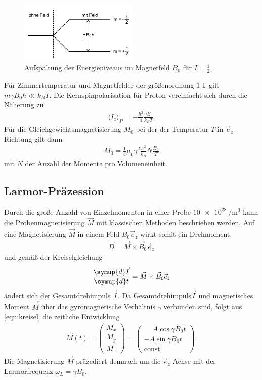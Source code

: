\begin{figure}
 \centering
 \includegraphics[width=0.5\textwidth]{Zeeman.PNG}
 \caption{Aufspaltung der Energieniveaus im Magnetfeld $B_0$ für $I=\tfrac{1}{2}$.\cite{sample}}
 \label{fig:Proton}
\end{figure}
Für Zimmertemperatur und Magnetfelder
der größenordnung $\SI{1}{\tesla}$
gilt $m\gamma B_0 \hbar \ll k_BT$.
Die Kernspinpolarisation für Proton
vereinfacht sich
durch die Näherung zu
\begin{align}
\langle I_z\rangle_P= -\frac{\hbar^2}{4}\frac{\gamma B_0}{k_B T}.
\end{align}
Für die Gleichgewichtsmagnetisierung $M_0$ bei der
der Temperatur $T$ in $\vec{e}_z$-Richtung gilt dann
\begin{align}
M_0=\frac{1}{4}\mu_0 \gamma^2 \frac{\hbar^2}{k_B} N \frac{B_0}{T}
\end{align}
mit $N$ der Anzahl der Momente pro Volumeneinheit.

\subsection{Larmor-Präzession}
\label{subsec:Larmor}
Durch die große Anzahl von Einzelmomenten in einer Probe \approx $\SI{10e28}{\per\cubic\meter}$
kann die Probenmagnetisierung $\vec{M}$ mit klassischen Methoden
beschrieben werden.
Auf eine Magnetisierung $\vec{M}$ in einem Feld $B_0\vec{e}_z$
wirkt somit ein Drehmoment
\begin{align}
\vec{D}=\vec{M} \times \vec{B}_0 \vec{e}_z
\end{align}
und gemäß der Kreiselgleichung
\begin{align}
  \frac{\symup{d}\vec{I}}{\symup{d}t}=\vec{M}\times\vec{B}_0 \vec{e}_z \label{eqn:kreisel}
\end{align}
 ändert sich der Gesamtdrehimpuls $\vec{I}$.
Da Gesamtdrehimpuls$\vec{I}$ und magnetisches Moment $\vec{M}$
über das gyromagnetische Verhältnis $\gamma$
verbunden sind, folgt aus \eqref{eqn:kreisel}
die zeitliche Entwicklung
\begin{align}
  \vec{M}(t)=
  \left( \begin{array}{c} M_x \\ M_y \\ M_z \end{array}\right)
=\left( \begin{array}{c} \phantom{-}A\cos\gamma B_0 t \\ -A\sin\gamma B_0 t \\ \text{const} \end{array}\right).
\end{align}
Die Magnetisierung $\vec{M}$ präzediert demnach um die
$\vec{e}_z$-Achse mit der Larmorfrequenz $\omega_L=\gamma B_0$.

